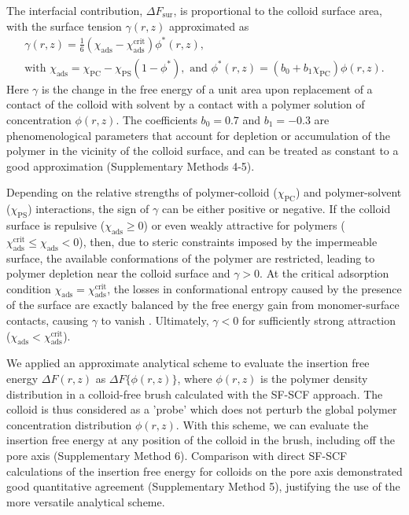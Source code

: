 \documentclass[12pt, a4paper]{article}
\begin{document}
The interfacial contribution, $\Delta F_{\text{sur}}$, is proportional to the colloid surface area, with the surface tension $\gamma (r,z)$ approximated as
\begin{gather}
     \gamma (r,z)= \frac{1}{6}(\chi_{\text{ads}} - \chi_{\text{ads}}^{\text{crit}})\phi^{\ast}(r,z),
    \label{eq:chi_ads} 
    \\
    \text{with } \chi_{\text{ads}} = \chi_{\text{PC}} - \chi_{\text{PS}}(1-\phi^{\ast}), \text{ and } \phi^{\ast}(r,z)= (b_{0} + b_{1}\chi_{\text{PC}})\phi(r,z).
    \nonumber
\end{gather}
Here $\gamma$ is the change in the free energy of a unit area upon replacement of a contact of the colloid with solvent by a contact with a polymer solution of concentration $\phi(r,z)$.
The coefficients $b_0 = 0.7$ and $b_1 = -0.3$ are phenomenological parameters that account for depletion or accumulation of the polymer in the vicinity of the colloid surface, and can be treated as constant to a good approximation (Supplementary Methods 4-5).

Depending on the relative strengths of polymer-colloid ($\chi_{\text{PC}}$) and polymer-solvent ($\chi_{\text{PS}}$) interactions, the sign of $\gamma$ can be either positive or negative.
If the colloid surface is repulsive ($\chi_{\text{ads}} \geq 0$) or even weakly attractive for polymers ($\chi_{\text{ads}}^{\text{crit}} \leq \chi_{\text{ads}} < 0$), then, due to steric constraints imposed by the impermeable surface, the available conformations of the polymer are restricted, leading to polymer depletion near the colloid surface and $\gamma > 0$.
At the critical adsorption condition $\chi_{\text{ads}} = \chi_{\text{ads}}^{\text{crit}}$, the losses in conformational entropy caused by the presence of the surface are exactly balanced by the free energy gain from monomer-surface contacts, causing $\gamma$ to vanish \cite{Fleer1993,Birshtein1979,Birshtein1983,Eisenriegler1982}.
Ultimately, $\gamma < 0$ for sufficiently strong attraction ($\chi_{\text{ads}} < \chi_{\text{ads}}^{\text{crit}}$).

We applied an approximate analytical scheme to evaluate the insertion free energy $\Delta F(r,z)$ as $\Delta F\{\phi(r,z)\}$, where $\phi(r,z)$ is the polymer density distribution in a colloid-free brush calculated with the SF-SCF approach.
The colloid is thus considered as a 'probe' which does not perturb the global polymer concentration distribution $\phi(r,z)$.
With this scheme, we can evaluate the insertion free energy at any position of the colloid in the brush, including off the pore axis (Supplementary Method 6).
Comparison with direct SF-SCF calculations of the insertion free energy for colloids on the pore axis demonstrated good quantitative agreement (Supplementary Method 5), justifying the use of the more versatile analytical scheme.
\end{document}
